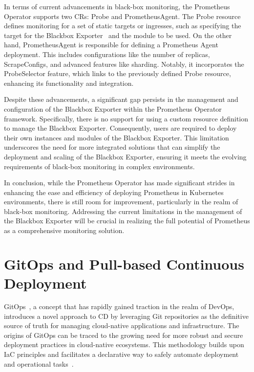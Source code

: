 In terms of current advancements in black-box monitoring, the Prometheus Operator supports two \ac{CR}s: Probe and PrometheusAgent. The Probe resource defines monitoring for a set of static targets or ingresses, such as specifying the target for the Blackbox Exporter~\parencite{BlackboxExporter} and the module to be used. On the other hand, PrometheusAgent is responsible for defining a Prometheus Agent~\parencite{PrometheusAgentSupport} deployment. This includes configurations like the number of replicas, ScrapeConfigs, and advanced features like sharding. Notably, it incorporates the ProbeSelector feature, which links to the previously defined Probe resource, enhancing its functionality and integration.

Despite these advancements, a significant gap persists in the management and configuration of the Blackbox Exporter within the Prometheus Operator framework. Specifically, there is no support for using a custom resource definition to manage the Blackbox Exporter. Consequently, users are required to deploy their own instances and modules of the Blackbox Exporter. This limitation underscores the need for more integrated solutions that can simplify the deployment and scaling of the Blackbox Exporter, ensuring it meets the evolving requirements of black-box monitoring in complex environments. 

In conclusion, while the Prometheus Operator has made significant strides in enhancing the ease and efficiency of deploying Prometheus in Kubernetes environments, there is still room for improvement, particularly in the realm of black-box monitoring. Addressing the current limitations in the management of the Blackbox Exporter will be crucial in realizing the full potential of Prometheus as a comprehensive monitoring solution. 

\section{GitOps and Pull-based Continuous Deployment}

GitOps~\parencite{WeaveworksWeavegitopsWeave}, a concept that has rapidly gained traction in the realm of DevOps, introduces a novel approach to \ac{CD} by leveraging Git repositories as the definitive source of truth for managing cloud-native applications and infrastructure. The origins of GitOps can be traced to the growing need for more robust and secure deployment practices in cloud-native ecosystems. This methodology builds upon \ac{IaC} principles and facilitates a declarative way to safely automate deployment and operational tasks~\parencite{ramadoniAnalysisUseDeclarative2021}. 

